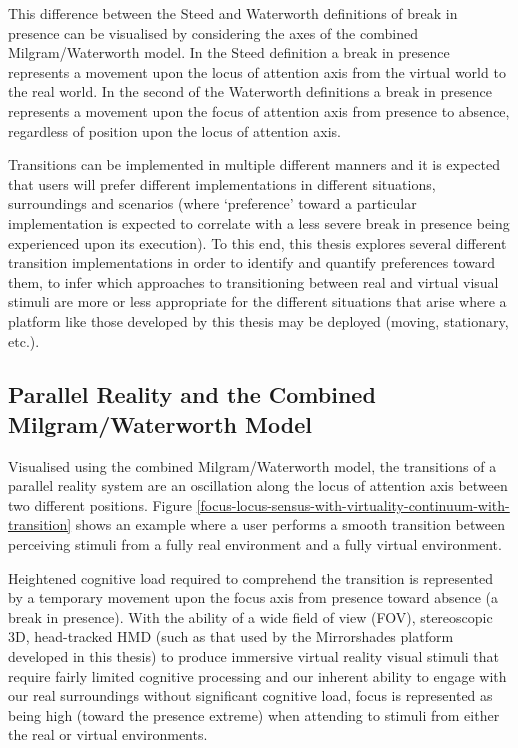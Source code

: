 This difference between the Steed and Waterworth definitions of break in presence can be visualised by considering the axes of the combined Milgram/Waterworth model. In the Steed definition a break in presence represents a movement upon the locus of attention axis from the virtual world to the real world. In the second of the Waterworth definitions a break in presence represents a movement upon the focus of attention axis from presence to absence, regardless of position upon the locus of attention axis.

Transitions can be implemented in multiple different manners and it is expected that users will prefer different implementations in different situations, surroundings and scenarios (where `preference' toward a particular implementation is expected to correlate with a less severe break in presence being experienced upon its execution). To this end, this thesis explores several different transition implementations in order to identify and quantify preferences toward them, to infer which approaches to transitioning between real and virtual visual stimuli are more or less appropriate for the different situations that arise where a platform like those developed by this thesis may be deployed (moving, stationary, etc.).


\subsection{Parallel Reality and the Combined Milgram/Waterworth Model}
Visualised using the combined Milgram/Waterworth model, the transitions of a parallel reality system are an oscillation along the locus of attention axis between two different positions. Figure \ref{focus-locus-sensus-with-virtuality-continuum-with-transition} shows an example where a user performs a smooth transition between perceiving stimuli from a fully real environment and a fully virtual environment.

Heightened cognitive load required to comprehend the transition is represented by a temporary movement upon the focus axis from presence toward absence (a break in presence). With the ability of a wide field of view (FOV), stereoscopic 3D, head-tracked HMD (such as that used by the Mirrorshades platform developed in this thesis) to produce immersive virtual reality visual stimuli that require fairly limited cognitive processing and our inherent ability to engage with our real surroundings without significant cognitive load, focus is represented as being high (toward the presence extreme) when attending to stimuli from either the real or virtual environments.

